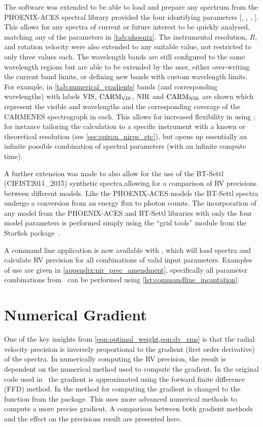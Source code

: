 The software was extended to be able to load and prepare any spectrum from the {PHOENIX-ACES} spectral library provided the four identifying parameters [\Teff, \Logg, \feh{}, \alphafe{}].
This allows for any spectra of current or future interest to be quickly analysed, matching any of the parameters in \cref{tab:phoenix}.
The instrumental resolution, \(R\), and rotation velocity \Vsini{} were also extended to any suitable value, not restricted to only three values each.
The \nir{} wavelength bands are still configured to the same wavelength regions but are able to be extended by the user, either over-writing the current band limits, or defining new bands with custom wavelength limits.
For example, in \cref{tab:numerical_gradients} bands (and corresponding wavelengths) with labels \({\rm VIS}\), \(\rm {CARM}_{VIS}\), \(\rm {NIR}\) and \(\rm {CARM}_{NIR}\) are shown which represent the visible and \nir{} wavelengths and the corresponding coverage of the {CARMENES} spectrograph in each.
This allows for increased flexibility in using \eniric{}; for instance tailoring the calculation to a specific instrument with a known or theoretical resolution (see \cref{sec:spirou_nirps_etc}), but opens up essentially an infinite possible combination of spectral parameters (with an infinite compute time).

A further extension was made to also allow for the use of the {BT-Settl} ({CIFIST2011\_2015}) synthetic spectra,allowing for a comparison of {RV} precisions between different models.
Like the {PHOENIX-ACES} models the {BT-Settl} spectra undergo a conversion from an energy flux to photon counts.
The incorporation of any model from the {PHOENIX-ACES} and {BT-Settl} libraries with only the four model parameters is performed simply using the ``grid tools'' module from the Starfish package~\citep{czekala_constructing_2015}.

A command line application is now available with \eniric{}, which will load spectra and calculate {RV} precision for all combinations of valid input parameters.
Examples of use are given in \cref{appendix:nir_prec_amendment}, specifically all parameter combinations from~\citet{figueira_radial_2016} can be performed using \cref{lst:commandline_incantation}.


\section{Numerical Gradient}
\label{sec:numerical_gradient}
One of the key insights from \cref{eqn:optimal_weight,eqn:dv_rms} is that the radial velocity precision is inversely proportional to the gradient (first order derivative) of the spectra.
In numerically computing the {RV} precision, the result is dependent on the numerical method used to compute the gradient.
In the original code used in~\citet{figueira_radial_2016} the gradient is approximated using the forward finite difference ({FFD}) method.
In \eniric{} the method for computing the gradient is changed to the \npgradient{} function from the \numpy{} package.
This uses more advanced numerical methods to compute a more precise gradient.
A comparison between both gradient methods and the effect on the precisions result are presented here.

